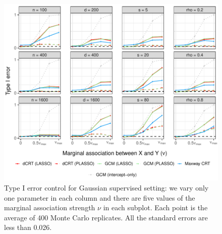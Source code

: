\documentclass[aos]{imsart}
\theoremstyle{plain}
\theoremstyle{remark}
\begin{document}
\begin{figure}[h]
    \centering
    \includegraphics[width = \textwidth]{figures/gaussian_supervised_setting_null_partial.pdf}
    \caption{Type I error control for Gaussian supervised setting: we vary only one parameter in each column and there are five values of the marginal association strength $\nu$ in each subplot. Each point is the average of 400 Monte Carlo replicates. All the standard errors are less than 0.026.}
    \label{fig:gaussian_supervised_partial_null}
\end{figure}
\end{document}
